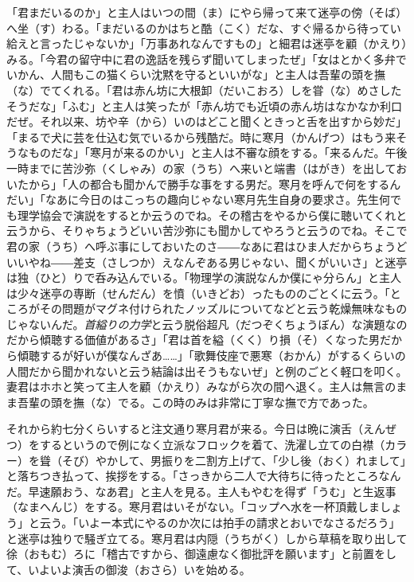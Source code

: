 \documentclass{book}
\begin{document}
「君まだいるのか」と主人はいつの間（ま）にやら帰って来て迷亭の傍（そば）へ坐（す）わる。「まだいるのかはちと酷（こく）だな、すぐ帰るから待ってい給えと言ったじゃないか」「万事あれなんですもの」と細君は迷亭を顧（かえり）みる。「今君の留守中に君の逸話を残らず聞いてしまったぜ」「女はとかく多弁でいかん、人間もこの猫くらい沈黙を守るといいがな」と主人は吾輩の頭を撫（な）でてくれる。「君は赤ん坊に大根卸（だいこおろ）しを甞（な）めさしたそうだな」「ふむ」と主人は笑ったが「赤ん坊でも近頃の赤ん坊はなかなか利口だぜ。それ以来、坊や辛（から）いのはどこと聞くときっと舌を出すから妙だ」「まるで犬に芸を仕込む気でいるから残酷だ。時に寒月（かんげつ）はもう来そうなものだな」「寒月が来るのかい」と主人は不審な顔をする。「来るんだ。午後一時までに苦沙弥（くしゃみ）の家（うち）へ来いと端書（はがき）を出しておいたから」「人の都合も聞かんで勝手な事をする男だ。寒月を呼んで何をするんだい」「なあに今日のはこっちの趣向じゃない寒月先生自身の要求さ。先生何でも理学協会で演説をするとか云うのでね。その稽古をやるから僕に聴いてくれと云うから、そりゃちょうどいい苦沙弥にも聞かしてやろうと云うのでね。そこで君の家（うち）へ呼ぶ事にしておいたのさ――なあに君はひま人だからちょうどいいやね――差支（さしつか）えなんぞある男じゃない、聞くがいいさ」と迷亭は独（ひと）りで呑み込んでいる。「物理学の演説なんか僕にゃ分らん」と主人は少々迷亭の専断（せんだん）を憤（いきどお）ったもののごとくに云う。「ところがその問題がマグネ付けられたノッズルについてなどと云う乾燥無味なものじゃないんだ。\emph{首縊りの力学}と云う脱俗超凡（だつぞくちょうぼん）な演題なのだから傾聴する価値があるさ」「君は首を縊（くく）り損（そ）くなった男だから傾聴するが好いが僕なんざあ\ldots{}\ldots{}」「歌舞伎座で悪寒（おかん）がするくらいの人間だから聞かれないと云う結論は出そうもないぜ」と例のごとく軽口を叩く。妻君はホホと笑って主人を顧（かえり）みながら次の間へ退く。主人は無言のまま吾輩の頭を撫（な）でる。この時のみは非常に丁寧な撫で方であった。

それから約七分くらいすると注文通り寒月君が来る。今日は晩に演舌（えんぜつ）をするというので例になく立派なフロックを着て、洗濯し立ての白襟（カラー）を聳（そび）やかして、男振りを二割方上げて、「少し後（おく）れまして」と落ちつき払って、挨拶をする。「さっきから二人で大待ちに待ったところなんだ。早速願おう、なあ君」と主人を見る。主人もやむを得ず「うむ」と生返事（なまへんじ）をする。寒月君はいそがない。「コップへ水を一杯頂戴しましょう」と云う。「いよー本式にやるのか次には拍手の請求とおいでなさるだろう」と迷亭は独りで騒ぎ立てる。寒月君は内隠（うちがく）しから草稿を取り出して徐（おもむ）ろに「稽古ですから、御遠慮なく御批評を願います」と前置をして、いよいよ演舌の御浚（おさら）いを始める。
\end{document}
